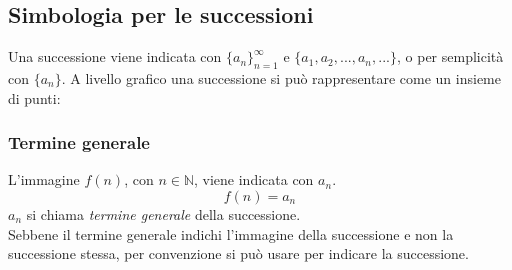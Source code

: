 \documentclass[a4paper,12pt, oneside]{book}
\begin{document}
\subsection{Simbologia per le successioni}
Una successione viene indicata con $\{a_n\}_{n=1}^{\infty}$ e $\{ a_1, a_2, ..., a_n, ... \}$, o per semplicità con $\{a_n\}$. A livello grafico una successione si può rappresentare come un insieme di punti:
\begin{center}
\end{center}
\subsubsection{Termine generale}
L'immagine $f(n)$, con $n \in \mathbb{N}$, viene indicata con $a_n$.
\begin{equation}
	f(n) = a_n
\end{equation}
$a_n$ si chiama \emph{termine generale} della successione.\\
Sebbene il termine generale indichi l'immagine della successione e non la successione stessa, per convenzione si può usare per indicare la successione.
\end{document}
